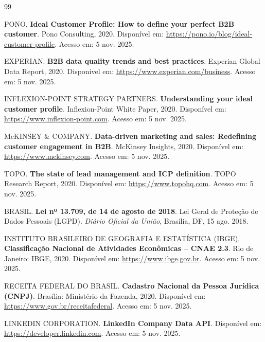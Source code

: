 \documentclass[
        oneside,      %
        english,			
        brazil			 
        ]{abntbibufjf}
\begin{document}
\begin{thebibliography}{99}

 PONO. 
\textbf{Ideal Customer Profile: How to define your perfect B2B customer}. 
Pono Consulting, 2020. 
Disponível em: \url{https://pono.io/blog/ideal-customer-profile}. 
Acesso em: 5 nov. 2025.

 EXPERIAN. 
\textbf{B2B data quality trends and best practices}. 
Experian Global Data Report, 2020. 
Disponível em: \url{https://www.experian.com/business}. 
Acesso em: 5 nov. 2025.

 INFLEXION-POINT STRATEGY PARTNERS. 
\textbf{Understanding your ideal customer profile}. 
Inflexion-Point White Paper, 2020. 
Disponível em: \url{https://www.inflexion-point.com}. 
Acesso em: 5 nov. 2025.

 McKINSEY \& COMPANY. 
\textbf{Data-driven marketing and sales: Redefining customer engagement in B2B}. 
McKinsey Insights, 2020. 
Disponível em: \url{https://www.mckinsey.com}. 
Acesso em: 5 nov. 2025.

 TOPO. 
\textbf{The state of lead management and ICP definition}. 
TOPO Research Report, 2020. 
Disponível em: \url{https://www.topohq.com}. 
Acesso em: 5 nov. 2025.

 BRASIL. 
\textbf{Lei nº 13.709, de 14 de agosto de 2018}. 
Lei Geral de Proteção de Dados Pessoais (LGPD). 
\textit{Diário Oficial da União}, Brasília, DF, 15 ago. 2018.

 INSTITUTO BRASILEIRO DE GEOGRAFIA E ESTATÍSTICA (IBGE). 
\textbf{Classificação Nacional de Atividades Econômicas – CNAE 2.3}. 
Rio de Janeiro: IBGE, 2020. 
Disponível em: \url{https://www.ibge.gov.br}. 
Acesso em: 5 nov. 2025.

 RECEITA FEDERAL DO BRASIL. 
\textbf{Cadastro Nacional da Pessoa Jurídica (CNPJ)}. 
Brasília: Ministério da Fazenda, 2020. 
Disponível em: \url{https://www.gov.br/receitafederal}. 
Acesso em: 5 nov. 2025.

 LINKEDIN CORPORATION. 
\textbf{LinkedIn Company Data API}. 
Disponível em: \url{https://developer.linkedin.com}. 
Acesso em: 5 nov. 2025.

\end{thebibliography}
\end{document}
